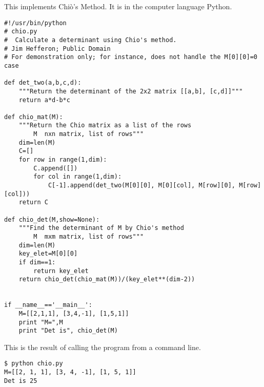 \announcecomputercode
This implements Chi\`o's Method.
It is in the computer language Python.
\begin{lstlisting}
#!/usr/bin/python
# chio.py
#  Calculate a determinant using Chio's method.
# Jim Hefferon; Public Domain
# For demonstration only; for instance, does not handle the M[0][0]=0 case

def det_two(a,b,c,d):
    """Return the determinant of the 2x2 matrix [[a,b], [c,d]]"""
    return a*d-b*c

def chio_mat(M):
    """Return the Chio matrix as a list of the rows
        M  nxn matrix, list of rows"""
    dim=len(M)
    C=[]
    for row in range(1,dim):
        C.append([])
        for col in range(1,dim):  
            C[-1].append(det_two(M[0][0], M[0][col], M[row][0], M[row][col]))
    return C

def chio_det(M,show=None):
    """Find the determinant of M by Chio's method
        M  mxm matrix, list of rows"""
    dim=len(M)
    key_elet=M[0][0]
    if dim==1:
        return key_elet
    return chio_det(chio_mat(M))/(key_elet**(dim-2))


if __name__=='__main__':
    M=[[2,1,1], [3,4,-1], [1,5,1]]
    print "M=",M
    print "Det is", chio_det(M)
\end{lstlisting}
This is the result of calling the program from a command line.
\begin{lstlisting}
$ python chio.py
M=[[2, 1, 1], [3, 4, -1], [1, 5, 1]]
Det is 25
\end{lstlisting}
\endinput
